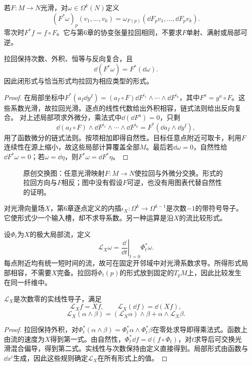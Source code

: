 \begin{definition}[形式的拉回]
若$F:M\to N$光滑，对$\omega\in\Omega^k(N)$定义
\[
 (F^*\omega)_p(v_1,\ldots,v_k)
 =\omega_{F(p)}(\dd F_pv_1,\ldots,\dd F_pv_k).
\]
零次时$F^*f=f\circ F$。它与第6章的协变张量拉回相同，不要求$F$单射、满射或局部可逆。
\end{definition}
\begin{theorem}[拉回与外微分的自然性]\label{thm:d-pullback}
拉回保持次数、外积、恒等与反向复合，且
\[
 \dd(F^*\omega)=F^*(\dd\omega).
\]
因此闭形式与恰当形式均拉回为相应类型的形式。
\end{theorem}
\begin{proof}
在局部坐标中$F^*(a_I\dd y^I)=(a_I\circ F)\dd F^{i_1}\wedge\cdots\wedge\dd F^{i_k}$，其中$F^a=y^a\circ F$。这些系数光滑，故拉回光滑。逐点的线性代数给出外积相容，链式法则给出反向复合。
对上述局部项求外微分，乘法式中$\dd(\dd F^a)=0$，只剩
\[
 \dd(a_I\circ F)\wedge\dd F^{i_1}\wedge\cdots\wedge\dd F^{i_k}
 =F^*(\dd a_I\wedge\dd y^I),
\]
用了函数微分的链式法则。按项相加即得自然性。目标任意点附近可取卡，利用$F$连续性在源上缩小，故这些局部计算覆盖全部$M$。最后若$\dd\omega=0$，自然性给$\dd F^*\omega=0$；若$\omega=\dd\eta$，则$F^*\omega=\dd F^*\eta$。
\end{proof}
\begin{figure}[htbp]
\centering
\caption{原创交换图：任意光滑映射$F:M\to N$使拉回与外微分交换。形式的拉回方向与$F$相反；图中没有假设$F$可逆，也没有用图表代替自然性的证明。}
\label{fig:forms-pullback}
\end{figure}
对光滑向量场$X$，第6章逐点定义的内插$\iota_X:\Omega^k\to\Omega^{k-1}$是次数$-1$的带符号导子。它使形式少一个输入槽，却不求导系数。另一种运算是沿$X$的流比较形式。
\begin{definition}[形式的Lie导数]
设$\Phi_t$为$X$的极大局部流，定义
\[
 \mathcal L_X\omega=\left.\frac{\dd}{\dd t}\right|_{t=0}\Phi_t^*\omega.
\]
每点附近均有统一短时间的流，故可在固定开邻域中对光滑系数求导。所得形式局部相容，不需要$X$完备。拉回将$\Phi_t(p)$的形式放到固定的$T_pM$上，因此比较发生在同一纤维中。
\end{definition}
\begin{lemma}[Lie导数的局部生成规则]\label{lem:lie-forms}
$\mathcal L_X$是次数零的实线性导子，满足
\[
 \mathcal L_Xf=Xf,\qquad\mathcal L_X(\dd f)=\dd(Xf),
\]
\[
 \mathcal L_X(\alpha\wedge\beta)
 =(\mathcal L_X\alpha)\wedge\beta+\alpha\wedge\mathcal L_X\beta.
\]
\end{lemma}
\begin{proof}
拉回保持外积，对$\Phi_t^*(\alpha\wedge\beta)=\Phi_t^*\alpha\wedge\Phi_t^*\beta$在零处求导即得乘法式。函数上由流的速度为$X$得到第一式。由自然性，$\Phi_t^*\dd f=\dd(f\circ\Phi_t)$，对$t$求导后可交换光滑混合偏导，得到第二式。实线性与次数保持由定义直接得到。局部形式由函数与$\dd x^i$生成，因此这些规则确定$\mathcal L_X$在所有形式上的值。
\end{proof}
